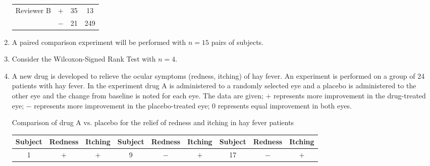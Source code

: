 \documentclass[12pt]{article}
\begin{document}
\begin{enumerate}[Problem 1.]
\begin{center}
\begin{tabular}{llcc}
Reviewer B & $+$ & 35 & 13 \\
& $-$ & 21 & 249 
\end{tabular}
\end{center}
\vspace{+0.25in}
\item A paired comparison experiment will be performed with $n=15$ pairs of
subjects.
\item Consider the Wilcoxon-Signed Rank Test with $n = 4$.
\item A new drug is developed to relieve the ocular symptoms (redness, itching) 
of hay fever.  An experiment is performed on a group of 24 patients with hay fever.
In the experiment drug A is administered to a randomly selected eye and a placebo
is administered to the other eye and the change from baseline is noted for each
eye.  The data are given; $+$ represents more improvement in the drug-treated eye;
$-$ represents more improvement in the placebo-treated eye; $0$ represents 
equal improvement in both eyes.
\begin{center}
Comparison of drug A vs. placebo for the relief of redness
and itching in hay fever patients
\begin{tabular}{ccccccccc}
\\ \hline
Subject & Redness & Itching & Subject & Redness & Itching & Subject & Redness
& Itching \\ \hline
1 & $+$ & $+$ & 9  & $-$ & $+$ & 17 & $-$ & $+$ \\

\end{tabular}
\end{center}
\end{enumerate}
\end{document}
